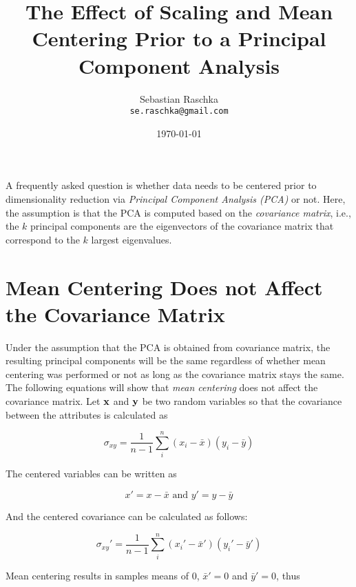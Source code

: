 \documentclass[fleqn]{article}
\title{The Effect of Scaling and Mean Centering Prior to a Principal Component Analysis}
\author{Sebastian Raschka\\ \texttt{se.raschka@gmail.com}}
\date{\today}
\begin{document}

\maketitle %



\noindent A frequently asked question is whether data needs to be centered prior to dimensionality reduction via \emph{Principal Component Analysis (PCA)} or not. Here, the assumption is that the PCA is computed based on the \emph{covariance matrix}, i.e., the $k$ principal components are the eigenvectors of the covariance matrix that correspond to the $k$ largest eigenvalues.



\section{Mean Centering Does not Affect the Covariance Matrix}
\label{meancenteringdoesnotaffectthecovariancematrix}

Under the assumption that the PCA is obtained from covariance matrix, the resulting principal components will be the same regardless of whether mean centering was performed or not as long as the covariance matrix stays the same. The following equations will show that \emph{mean centering} does not affect the covariance matrix.
\noindent Let  $\bf{x}$ and $\bf{y}$  be two random variables so that  the covariance between the attributes is calculated as

\begin{equation} \sigma_{xy} = \frac{1}{n-1} \sum_{i}^{n} (x_i - \bar{x})(y_i - \bar{y})   \end{equation}

\noindent The centered variables can be written as

\begin{equation} x' = x - \bar{x} \text{ and } y' = y - \bar{y} \end{equation}

\noindent And the centered covariance can be calculated as follows:

\begin{equation} \sigma_{xy}' = \frac{1}{n-1} \sum_{i}^{n} (x_i' - \bar{x}')(y_i' - \bar{y}')   \end{equation}

\noindent Mean centering results in samples means of 0, $\bar{x}' = 0$ and $\bar{y}' = 0$, thus
\end{document}
